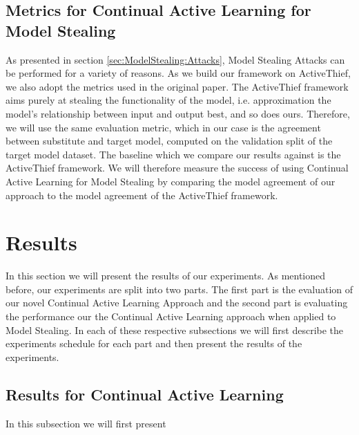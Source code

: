 \subsection{Metrics for Continual Active Learning for Model Stealing}
\label{sec:Evaluation:Metrics:CALMS}
As presented in section \ref{sec:ModelStealing:Attacks}, Model Stealing Attacks can be performed for a variety of reasons. As we build our framework on ActiveThief, we also
adopt the metrics used in the original paper. The ActiveThief framework aims purely at stealing the functionality of the model, i.e. approximation the model's relationship
between input and output best, and so does ours. Therefore, we will use the same evaluation metric, which in our case is the agreement between substitute and target model,
computed on the validation split of the target model dataset. The baseline which we compare our results against is the ActiveThief framework. We will therefore measure the 
success of using Continual Active Learning for Model Stealing by comparing the model agreement of our approach to the model agreement of the ActiveThief framework.

\section{Results}
\label{sec:Evaluation:Results}
In this section we will present the results of our experiments. As mentioned before, our experiments are split into two parts. The first part is the evaluation of our novel
Continual Active Learning Approach and the second part is evaluating the performance our the Continual Active Learning approach when applied to Model Stealing. In each of these
respective subsections we will first describe the experiments schedule for each part and then present the results of the experiments.

\subsection{Results for Continual Active Learning}
\label{sec:Evaluation:Results:CAL}
In this subsection we will first present

